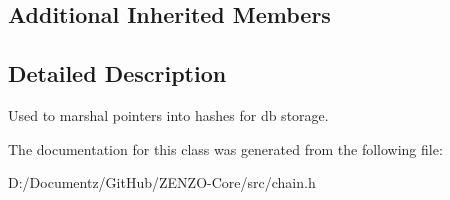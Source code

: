 \subsection*{Additional Inherited Members}


\subsection{Detailed Description}
Used to marshal pointers into hashes for db storage. 

The documentation for this class was generated from the following file\+:\begin{DoxyCompactItemize}
\item 
D\+:/\+Documentz/\+Git\+Hub/\+Z\+E\+N\+Z\+O-\/\+Core/src/chain.\+h\end{DoxyCompactItemize}
